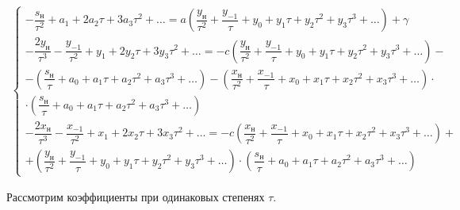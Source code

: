 \begin{eqnarray*}
	\left\{
		\begin{aligned}
			-\dfrac{s_{\text{н}}}{\tau^{2}} + a_1 + 2a_2\tau + 3a_3\tau^2 + \ldots = a \left( \dfrac{y_{\text{н}}}{\tau^2} + \dfrac{y_{-1}}{\tau} + y_0 + y_1\tau + y_2\tau^2 + y_3\tau^3 + \ldots \right) + \gamma \\			
			-\dfrac{2y_{\text{н}}}{\tau^{3}} - \dfrac{y_{-1}}{\tau^2} + y_1 + 2y_2\tau + 3y_3\tau^2 + \ldots = -c \left( \dfrac{y_{\text{н}}}{\tau^2} + \dfrac{y_{-1}}{\tau} + y_0 + y_1\tau + y_2\tau^2 + y_3\tau^3 + \ldots \right) - \\ - \left( \dfrac{s_{\text{н}}}{\tau} + a_0 + a_1\tau + a_2\tau^2 + a_3\tau^3 + \ldots \right) - \left( \dfrac{x_{\text{н}}}{\tau^2} + \dfrac{x_{-1}}{\tau} + x_0 + x_1\tau + x_2\tau^2 + x_3\tau^3 + \ldots \right) \cdot \\ \cdot \left( \dfrac{s_{\text{н}}}{\tau} + a_0 + a_1\tau + a_2\tau^2 + a_3\tau^3 + \ldots \right) \\	
			-\dfrac{2x_{\text{н}}}{\tau^{3}} - \dfrac{x_{-1}}{\tau^2} + x_1 + 2x_2\tau + 3x_3\tau^2 + \ldots = -c \left( \dfrac{x_{\text{н}}}{\tau^2} + \dfrac{x_{-1}}{\tau} + x_0 + x_1\tau + x_2\tau^2 + x_3\tau^3 + \ldots \right) + \\ + \left( \dfrac{y_{\text{н}}}{\tau^2} + \dfrac{y_{-1}}{\tau} + y_0 + y_1\tau + y_2\tau^2 + y_3\tau^3 + \ldots \right) \cdot \left( \dfrac{s_{\text{н}}}{\tau} + a_0 + a_1\tau + a_2\tau^2 + a_3\tau^3 + \ldots \right)
		\end{aligned}
	\right.
\end{eqnarray*}

Рассмотрим коэффициенты при одинаковых степенях $ \tau $.
 
